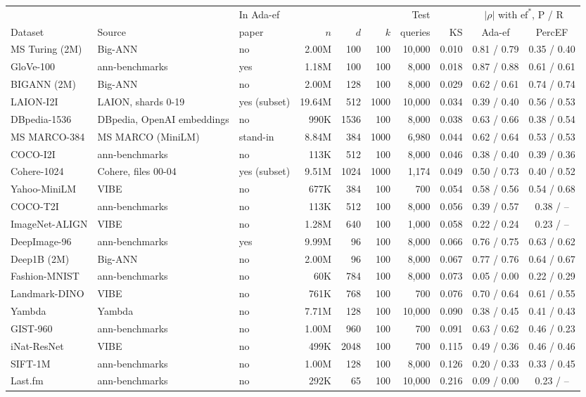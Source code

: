 \begin{tabular}{lllrrrrrcc}
\toprule
& & In Ada-ef & & & & Test & & \multicolumn{2}{c}{$|\rho|$ with $\mathrm{ef}^*$, P / R} \\
\cmidrule(lr){9-10}
Dataset & Source & paper & $n$ & $d$ & $k$ & queries & KS & Ada-ef & PercEF \\
\midrule
MS Turing (2M) & Big-ANN & no & 2.00M & 100 & 100 & 10,000 & 0.010 & 0.81 / 0.79 & 0.35 / 0.40 \\
GloVe-100 & ann-benchmarks & yes & 1.18M & 100 & 100 & 8,000 & 0.018 & 0.87 / 0.88 & 0.61 / 0.61 \\
BIGANN (2M) & Big-ANN & no & 2.00M & 128 & 100 & 8,000 & 0.029 & 0.62 / 0.61 & 0.74 / 0.74 \\
LAION-I2I & LAION, shards 0-19 & yes (subset) & 19.64M & 512 & 1000 & 10,000 & 0.034 & 0.39 / 0.40 & 0.56 / 0.53 \\
DBpedia-1536 & DBpedia, OpenAI embeddings & no & 990K & 1536 & 100 & 8,000 & 0.038 & 0.63 / 0.66 & 0.38 / 0.54 \\
MS MARCO-384 & MS MARCO (MiniLM) & stand-in & 8.84M & 384 & 1000 & 6,980 & 0.044 & 0.62 / 0.64 & 0.53 / 0.53 \\
COCO-I2I & ann-benchmarks & no & 113K & 512 & 100 & 8,000 & 0.046 & 0.38 / 0.40 & 0.39 / 0.36 \\
Cohere-1024 & Cohere, files 00-04 & yes (subset) & 9.51M & 1024 & 1000 & 1,174 & 0.049 & 0.50 / 0.73 & 0.40 / 0.52 \\
Yahoo-MiniLM & VIBE & no & 677K & 384 & 100 & 700 & 0.054 & 0.58 / 0.56 & 0.54 / 0.68 \\
COCO-T2I & ann-benchmarks & no & 113K & 512 & 100 & 8,000 & 0.056 & 0.39 / 0.57 & 0.38 / -- \\
ImageNet-ALIGN & VIBE & no & 1.28M & 640 & 100 & 1,000 & 0.058 & 0.22 / 0.24 & 0.23 / -- \\
DeepImage-96 & ann-benchmarks & yes & 9.99M & 96 & 100 & 8,000 & 0.066 & 0.76 / 0.75 & 0.63 / 0.62 \\
Deep1B (2M) & Big-ANN & no & 2.00M & 96 & 100 & 8,000 & 0.067 & 0.77 / 0.76 & 0.64 / 0.67 \\
Fashion-MNIST & ann-benchmarks & no & 60K & 784 & 100 & 8,000 & 0.073 & 0.05 / 0.00 & 0.22 / 0.29 \\
Landmark-DINO & VIBE & no & 761K & 768 & 100 & 700 & 0.076 & 0.70 / 0.64 & 0.61 / 0.55 \\
Yambda & Yambda & no & 7.71M & 128 & 100 & 10,000 & 0.090 & 0.38 / 0.45 & 0.41 / 0.43 \\
GIST-960 & ann-benchmarks & no & 1.00M & 960 & 100 & 700 & 0.091 & 0.63 / 0.62 & 0.46 / 0.23 \\
iNat-ResNet & VIBE & no & 499K & 2048 & 100 & 700 & 0.115 & 0.49 / 0.36 & 0.46 / 0.46 \\
SIFT-1M & ann-benchmarks & no & 1.00M & 128 & 100 & 8,000 & 0.126 & 0.20 / 0.33 & 0.33 / 0.45 \\
Last.fm & ann-benchmarks & no & 292K & 65 & 100 & 10,000 & 0.216 & 0.09 / 0.00 & 0.23 / -- \\
\bottomrule
\end{tabular}
